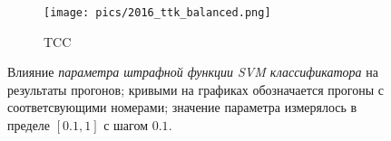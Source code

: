 \begin{figure}[!htp]
    \begin{subfigure}[b]{0.45\textwidth}
        \texttt{[image: pics/2016\_ttk\_balanced.png]}
        \caption{TCC}
        \label{fig:ttk_cost_changes_2016}
    \end{subfigure}

    \caption{
        Влияние {\it параметра штрафной функции SVM классификатора}
        на результаты прогонов;
        кривыми на графиках обозначается прогоны с соответсвующими номерами;
        значение параметра измерялось в пределе $[0.1, 1]$ с шагом $0.1$.
    }
    \label{fig:cost}
\end{figure}
